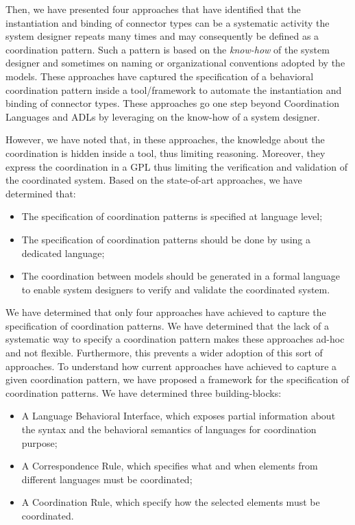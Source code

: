 Then, we have presented four approaches that have identified that the instantiation and binding of connector types can be a systematic activity the system designer repeats many times and may consequently be defined as a coordination pattern. Such a pattern is based on the \emph{know-how} of the system designer and sometimes on naming or organizational conventions adopted by the models. These approaches have captured the specification of a behavioral coordination pattern inside a tool/framework to automate the instantiation and binding of connector types. These approaches go one step beyond Coordination Languages and ADLs by leveraging on the know-how of a system designer.

However, we have noted that, in these approaches, the knowledge about the coordination is hidden inside a tool, thus limiting reasoning. Moreover, they express the coordination in a GPL thus limiting the verification and validation of the coordinated system. Based on the state-of-art approaches, we have determined that:

\begin{itemize}
\item The specification of coordination patterns is specified at language level;
	 
\item The specification of coordination patterns should be done by using a dedicated language; 
	 
\item The coordination between models should be generated in a formal language to enable system designers to verify and validate the coordinated system. 		
\end{itemize}

We have determined that only four approaches have achieved to capture the specification of coordination patterns. We have determined that the lack of a systematic way to specify a coordination pattern makes these approaches ad-hoc and not flexible. Furthermore, this prevents a wider adoption of this sort of approaches. To understand how current approaches have achieved to capture a given coordination pattern, we have proposed a framework for the specification of coordination patterns. We have determined three building-blocks:

	\begin{itemize}
	\item A Language Behavioral Interface, which exposes partial information about the syntax and the behavioral semantics of languages for coordination purpose; 
	
	\item A Correspondence Rule, which specifies what and when elements from different languages must be coordinated;
	
	\item A Coordination Rule, which specify how the selected elements must be coordinated. 
\end{itemize}

